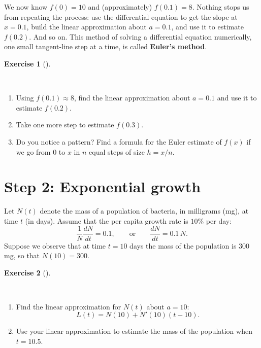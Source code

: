 \documentclass[
  letterpaper,
  DIV=11,
  numbers=noendperiod]{scrreprt}
\providecommand{\tightlist}{%
  \setlength{\itemsep}{0pt}\setlength{\parskip}{0pt}}
\theoremstyle{plain}
\theoremstyle{plain}
\theoremstyle{definition}
\theoremstyle{definition}
\newtheorem{exercise}{Exercise}[chapter]
\theoremstyle{definition}
\theoremstyle{plain}
\theoremstyle{plain}
\theoremstyle{remark}
\begin{document}
We now know \(f(0) = 10\) and (approximately) \(f(0.1) = 8\). Nothing
stops us from repeating the process: use the differential equation to
get the slope at \(x = 0.1\), build the linear approximation about
\(a = 0.1\), and use it to estimate \(f(0.2)\). And so on. This method
of solving a differential equation numerically, one small tangent-line
step at a time, is called \textbf{Euler's method}.

\begin{exercise}[]\protect\hypertarget{exr-activity-euler-steps}{}\label{exr-activity-euler-steps}

~

\begin{enumerate}
\def\labelenumi{\arabic{enumi}.}
\tightlist
\item
  Using \(f(0.1) \approx 8\), find the linear approximation about
  \(a = 0.1\) and use it to estimate \(f(0.2)\).
\item
  Take one more step to estimate \(f(0.3)\).
\item
  Do you notice a pattern? Find a formula for the Euler estimate of
  \(f(x)\) if we go from \(0\) to \(x\) in \(n\) equal steps of size
  \(h = x/n\).
\end{enumerate}

\end{exercise}

\section{Step 2: Exponential growth}\label{step-2-exponential-growth}

Let \(N(t)\) denote the mass of a population of bacteria, in milligrams
(mg), at time \(t\) (in days). Assume that the per capita growth rate is
\(10\%\) per day: \[
\frac{1}{N}\frac{dN}{dt} = 0.1, \qquad\text{or}\qquad \frac{dN}{dt} = 0.1\,N.
\] Suppose we observe that at time \(t = 10\) days the mass of the
population is \(300\) mg, so that \(N(10) = 300\).

\begin{exercise}[]\protect\hypertarget{exr-activity-exponential-growth}{}\label{exr-activity-exponential-growth}

~

\begin{enumerate}
\def\labelenumi{\arabic{enumi}.}
\tightlist
\item
  Find the linear approximation for \(N(t)\) about \(a = 10\): \[
  L(t) = N(10) + N'(10)(t - 10).
  \]
\item
  Use your linear approximation to estimate the mass of the population
  when \(t = 10.5\).
\end{enumerate}

\end{exercise}
\end{document}
